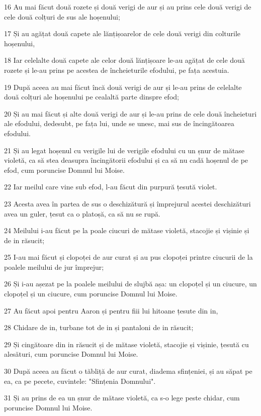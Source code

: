 \par 16 Au mai făcut două rozete și două verigi de aur și au prins cele două verigi de cele două colțuri de sus ale hoșenului;
\par 17 Și au agățat două capete ale lănțișoarelor de cele două verigi din colturile hoșenului,
\par 18 Iar celelalte două capete ale celor două lănțișoare le-au agățat de cele două rozete și le-au prins pe acestea de încheieturile efodului, pe fața acestuia.
\par 19 După aceea au mai făcut încă două verigi de aur și le-au prins de celelalte două colțuri ale hoșenului pe cealaltă parte dinspre efod;
\par 20 Și au mai făcut și alte două verigi de aur și le-au prins de cele două încheieturi ale efodului, dedesubt, pe fața lui, unde se unesc, mai sus de încingătoarea efodului.
\par 21 Și au legat hoșenul cu verigile lui de verigile efodului cu un șnur de mătase violetă, ca să stea deasupra încingătorii efodului și ca să nu cadă hoșenul de pe efod, cum poruncise Domnul lui Moise.
\par 22 Iar meilul care vine sub efod, l-au făcut din purpură țesută violet.
\par 23 Acesta avea în partea de sus o deschizătură și împrejurul acestei deschizături avea un guler, țesut ca o platoșă, ca să nu se rupă.
\par 24 Meilului i-au făcut pe la poale ciucuri de mătase violetă, stacojie și vișinie și de in răsucit;
\par 25 I-au mai făcut și clopoței de aur curat și au pus clopoței printre ciucurii de la poalele meilului de jur împrejur;
\par 26 Și i-au așezat pe la poalele meilului de slujbă așa: un clopoțel și un ciucure, un clopoțel și un ciucure, cum poruncise Domnul lui Moise.
\par 27 Au făcut apoi pentru Aaron și pentru fiii lui hitoane țesute din in,
\par 28 Chidare de in, turbane tot de in și pantaloni de in răsucit;
\par 29 Și cingătoare din in răsucit și de mătase violetă, stacojie și vișinie, țesută cu alesături, cum poruncise Domnul lui Moise.
\par 30 După aceea au făcut o tăbliță de aur curat, diadema sfințeniei, și au săpat pe ea, ca pe pecete, cuvintele: "Sfințenia Domnului".
\par 31 Și au prins de ea un șnur de mătase violetă, ca s-o lege peste chidar, cum poruncise Domnul lui Moise.
